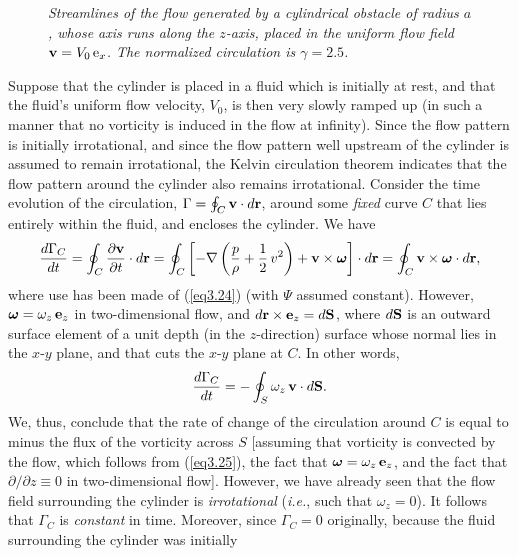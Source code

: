 \begin{figure}
\epsfysize=3in
\centerline{}
\caption{\em Streamlines of the flow generated by a cylindrical obstacle of radius $a$, whose axis runs  along the $z$-axis,
placed in the uniform flow field ${\bf v}= V_0\,{\rm e}_x$. The normalized circulation is $\gamma=2.5$. }\label{fxcyl2}
\end{figure}

Suppose that the cylinder  is placed in a fluid which is initially at rest, and that the fluid's uniform flow velocity, $V_0$,
is then very slowly ramped up (in such a manner that no vorticity is induced in the flow at infinity). Since the flow pattern is initially irrotational, and since the
flow pattern well upstream of the cylinder is assumed to remain irrotational, the Kelvin circulation theorem indicates
that the flow pattern around the cylinder also remains irrotational. Consider the time evolution of the circulation, $\Gamma=\oint_C{\bf v}\cdot d{\bf r}$,  around
some {\em fixed}\/  curve $C$ that lies entirely within the fluid, and encloses the cylinder. We have
\begin{equation}
\frac{d\Gamma_C}{dt} = \oint_C\frac{\partial {\bf v}}{\partial t}\cdot d{\bf r} =
\oint_C\left[-\nabla\left(\frac{p}{\rho}+\frac{1}{2}\,v^2\right) + {\bf v}\times \mbox{\boldmath$\omega$}\right]\cdot d{\bf r}= \oint_C {\bf v}\times \mbox{\boldmath$\omega$}\cdot d{\bf r},
\end{equation}
where use has been made of (\ref{eq3.24}) (with $\Psi$ assumed constant). However, $\mbox{\boldmath$\omega$}=\omega_z\,{\bf e}_z$ in two-dimensional flow, and
$d{\bf r}\times {\bf e}_z  =d{\bf S}$, where $d{\bf S}$ is an outward surface element of a unit depth (in the $z$-direction)
surface whose normal lies in the $x$-$y$ plane, and that cuts the $x$-$y$ plane at $C$. In other words,
\begin{equation}
\frac{d\Gamma_C}{dt} = -\oint_S \omega_z\,{\bf v}\cdot d{\bf S}.
\end{equation}
We, thus, conclude that the rate of change of the circulation around $C$ is equal to minus the flux of the vorticity across $S$
[assuming that vorticity is convected by the flow, which follows from (\ref{eq3.25}), the fact that $\mbox{\boldmath$\omega$}=\omega_z\,{\bf e}_z$, and the fact that $\partial/\partial z\equiv 0$ in two-dimensional flow]. 
However, we have already seen that the flow field surrounding the cylinder is {\em irrotational}\/ ({\em i.e.}, such that $\omega_z=0$). It follows that $\Gamma_C$
is  {\em constant}\/ in time. Moreover, since $\Gamma_C=0$ originally, because the fluid surrounding the cylinder was initially
